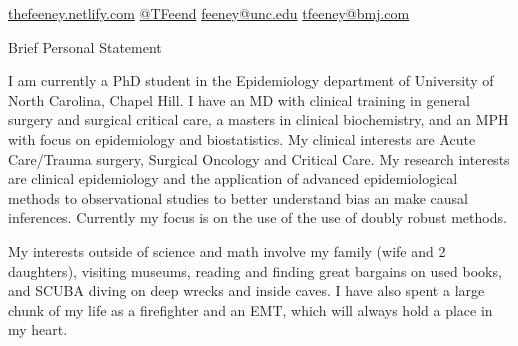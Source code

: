 \documentclass{resume} %
\begin{document}
%

\begin{center} 
 \href{https://thefeeney.netlify.com}{thefeeney.netlify.com}
 \hfill
 \href{https://twitter.com/TFeend}{@TFeend}
  \hfill
  \href{mailto:feeney@unc.edu}{feeney@unc.edu}
  \hfill
  \href{mailto:tfeeney@bmj.com}{tfeeney@bmj.com}
  \hfill
  \end{center}

\begin{rSection}{Brief Personal Statement}


{I am currently a PhD student in the Epidemiology department of University of North Carolina, Chapel Hill.
I have an MD with clinical training in general surgery and surgical critical care, a masters in clinical biochemistry, and an MPH with focus on epidemiology and biostatistics. My clinical interests are Acute Care/Trauma surgery, Surgical Oncology and
Critical Care. My research interests are clinical epidemiology and the application of advanced epidemiological methods to observational studies to better understand bias an make causal inferences. Currently my focus is on the use of the use of doubly robust methods.

My interests outside of science and math involve my family (wife and 2 daughters), visiting museums, reading and finding great bargains on used books, and SCUBA diving on deep wrecks and inside caves. I have also spent a large chunk of my life as a firefighter and an EMT, which will always hold a place in my heart.}

\end{rSection}
\end{document}
